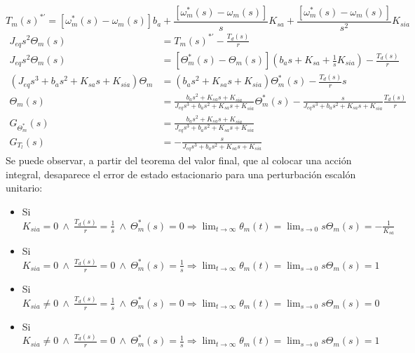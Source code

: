 \documentclass[a4paper, 10pt, onecolumn,journal]{ieeeconf}
\begin{document}
\begin{equation}
	{T_m(s)}^{*'} = \left[ {\omega}_m^{*}(s)-{\omega}_m(s)\right] b_a + \frac{\left[ {\omega}_m^{*}(s)-{\omega}_m(s)\right]}{s} K_{sa} + \frac{\left[ {\omega}_m^{*}(s)-{\omega}_m(s)\right]}{s^2} K_{sia}
\end{equation}
\begin{align}
	J_{eq} s^2 \Theta_m(s) &= {T_m(s)}^{*'}- \frac{T_d(s)}{r }  \\
	J_{eq} s^2 \Theta_m(s) &= \left[ {\Theta}_m^{*}(s)-{\Theta}_m(s)\right] \left( b_a s + K_{sa} + \frac{1}{s} K_{sia}\right)  - \frac{T_d(s)}{r } \\
	\left( J_{eq} s^3 + b_a s^2 + K_{sa} s +  K_{sia}\right) \Theta_m &=   \left( b_a s^2 + K_{sa} s + K_{sia}\right) {\Theta}_m^{*}(s)  - \frac{T_d(s)}{r} s \\ 
	\Theta_m(s) &= \frac{ b_a s^2 + K_{sa} s + K_{sia}}{J_{eq} s^3 + b_a s^2 + K_{sa} s +  K_{sia}} {\Theta}_m^{*}(s)  - \frac{s}{J_{eq} s^3 + b_a s^2 + K_{sa} s +  K_{sia}} \frac{T_d(s)}{r} \\
	G_{{\Theta}_m^{*}}(s) &= \frac{ b_a s^2 + K_{sa} s + K_{sia}}{J_{eq} s^3 + b_a s^2 + K_{sa} s +  K_{sia}} \\
	G_{T_l}(s) &= -\frac{s}{J_{eq} s^3 + b_a s^2 + K_{sa} s +  K_{sia}}
\end{align}
Se puede observar, a partir del teorema del valor final, que al colocar una acción integral, desaparece el error de estado estacionario para una perturbación escalón unitario:

\begin{itemize}
	\item Si $K_{sia}=0 \: \land \: \frac{T_d(s)}{r} = \frac{1}{s} \: \land \: {\Theta}_m^{*}(s) = 0 \Rightarrow \lim_{t \to \infty} \theta_m(t) = \lim_{s \to 0} s\Theta_m(s) = -\frac{1}{K_{sa}} $ 
	\item Si $K_{sia}=0 \: \land \: \frac{T_d(s)}{r} = 0 \: \land \: {\Theta}_m^{*}(s) = \frac{1}{s} \Rightarrow \lim_{t \to \infty} \theta_m(t) = \lim_{s \to 0} s\Theta_m(s) = 1 $
	\item Si $K_{sia}\neq0 \: \land \: \frac{T_d(s)}{r} = \frac{1}{s} \: \land \: {\Theta}_m^{*}(s) = 0 \Rightarrow \lim_{t \to \infty} \theta_m(t) = \lim_{s \to 0} s\Theta_m(s) = 0$
	\item Si $K_{sia}\neq0 \: \land \: \frac{T_d(s)}{r} = 0 \: \land \: {\Theta}_m^{*}(s) = \frac{1}{s} \Rightarrow \lim_{t \to \infty} \theta_m(t) = \lim_{s \to 0} s\Theta_m(s) = 1 $
\end{itemize}
\end{document}

